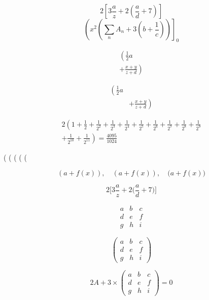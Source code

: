 \documentclass[letterpaper,notitlepage,11pt]{article}
\begin{document}
\begin{equation}
2 \left[3 \frac{a}{z} + 2 \left(\frac{a}{d}+7\right)\right]
\end{equation}
\begin{equation}
\left(x^2\left(\sum_nA_n + 3 \left(b + \frac{1}{c}\right)\right)\right]_0
\end{equation}

\begin{multline}
\left(\frac{1}{2} a \right. \\
\left.+\frac{x+y}{z+d}\right)
\end{multline}

\begin{align*}
\left(\frac12 a \right. & \\
&\left. +\frac{x+y}{z+d}\right)
\end{align*}

\begin{multline*}
2\left(1+\frac{1}{2}+\frac{1}{2^2}+\frac{1}{2^3}+\frac{1}{2^4}+\frac{1}{2^5}+\frac{1}{2^6}+\frac{1}{2^7}+\frac{1}{2^8}+\frac{1}{2^9} \right. \\
\left. +\frac{1}{2^{10}}+\frac{1}{2^{11}}\right) = \frac{4095}{1024}
\end{multline*}

( \big( \Big( \bigg( \Bigg(

\begin{equation}
(a+f(x)),\quad \left(a+f(x)\right), \quad \big(a+f(x)\big)
\end{equation}

\begin{equation}
2\Bigg[3\frac{a}{z}+
2\bigg(\frac{a}{d}+7\bigg)\Bigg]
\end{equation}

\newpage

\[
\begin{matrix}
a & b & c \\
d & e & f \\
g & h & i
\end{matrix}
\]

\[
\begin{pmatrix}
a & b & c \\
d & e & f \\
g & h & i
\end{pmatrix}
\]

\[
2A+3\times\begin{pmatrix}
a & b & c \\
d & e & f \\
g & h & i
\end{pmatrix}
=0
\]
\end{document}
